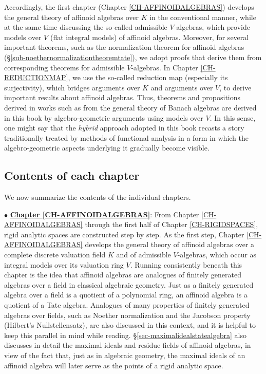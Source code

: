 \documentclass[a4paper,12pt, dvipdfmx]{jsbook}
\theoremstyle{plain}
\theoremstyle{definition}
\begin{document}
Accordingly, the first chapter (Chapter \ref{CH-AFFINOIDALGEBRAS}) develops the general theory of affinoid algebras over $K$ in the conventional manner, while at the same time discussing the so-called admissible $V$-algebras, which provide models over $V$ (flat integral models) of affinoid algebras.
Moreover, for several important theorems, such as the normalization theorem for affinoid algebras (\S\ref{sub-noethernormalizationtheoremtate}), we adopt proofs that derive them from corresponding theorems for admissible $V$-algebras.
In Chapter \ref{CH-REDUCTIONMAP}, we use the so-called reduction map (especially its surjectivity), which bridges arguments over $K$ and arguments over $V$, to derive important results about affinoid algebras.
Thus, theorems and propositions derived in works such as \cite{BGR} from the general theory of Banach algebras are derived in this book by algebro-geometric arguments using models over $V$.
In this sense, one might say that the {\it hybrid} approach adopted in this book recasts a story traditionally treated by methods of functional analysis in a form in which the algebro-geometric aspects underlying it gradually become visible.

\subsection{Contents of each chapter}\label{sub-contents}
We now summarize the contents of the individual chapters.

\medskip
$\bullet$ \underline{{\bf Chapter \ref{CH-AFFINOIDALGEBRAS}}}: From Chapter \ref{CH-AFFINOIDALGEBRAS} through the first half of Chapter \ref{CH-RIGIDSPACES}, rigid analytic spaces are constructed step by step.
As the first step, Chapter \ref{CH-AFFINOIDALGEBRAS} develops the general theory of affinoid algebras over a complete discrete valuation field $K$ and of admissible $V$-algebras, which occur as integral models over its valuation ring $V$.
Running consistently beneath this chapter is the idea that affinoid algebras are analogues of finitely generated algebras over a field in classical algebraic geometry.
Just as a finitely generated algebra over a field is a quotient of a polynomial ring, an affinoid algebra is a quotient of a Tate algebra.
Analogues of many properties of finitely generated algebras over fields, such as Noether normalization and the Jacobson property (Hilbert's Nullstellensatz), are also discussed in this context, and it is helpful to keep this parallel in mind while reading.
\S\ref{sec-maximalidealstatealgebra} also discusses in detail the maximal ideals and residue fields of affinoid algebras, in view of the fact that, just as in algebraic geometry, the maximal ideals of an affinoid algebra will later serve as the points of a rigid analytic space.
\end{document}
